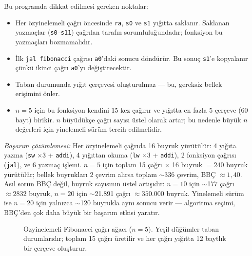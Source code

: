 \begin{ornek}[4.14]
Bu programda dikkat edilmesi gereken noktalar:
\begin{itemize}
\item Her özyinelemeli çağrı öncesinde \texttt{ra}, \texttt{s0} ve \texttt{s1} yığıtta saklanır. Saklanan yazmaçlar (\texttt{s0}--\texttt{s11}) çağrılan tarafın sorumluluğundadır; fonksiyon bu yazmaçları bozmamalıdır.
\item İlk \texttt{jal fibonacci} çağrısı \texttt{a0}'daki sonucu döndürür. Bu sonuç \texttt{s1}'e kopyalanır çünkü ikinci çağrı \texttt{a0}'yı değiştirecektir.
\item Taban durumunda yığıt çerçevesi oluşturulmaz --- bu, gereksiz bellek erişimini önler.
\item $n = 5$ için bu fonksiyon kendini 15 kez çağırır ve yığıtta en fazla 5 çerçeve (60 bayt) birikir. $n$ büyüdükçe çağrı sayısı üstel olarak artar; bu nedenle büyük $n$ değerleri için yinelemeli sürüm tercih edilmelidir.
\end{itemize}

\emph{Başarım çözümlemesi:} Her özyinelemeli çağrıda 16 buyruk yürütülür: 4 yığıta yazma (\texttt{sw} $\times 3$ + \texttt{addi}), 4 yığıttan okuma (\texttt{lw} $\times 3$ + \texttt{addi}), 2 fonksiyon çağrısı (\texttt{jal}), ve 6 yazmaç işlemi. $n = 5$ için toplam 15 çağrı $\times$ 16 buyruk $= 240$ buyruk yürütülür; bellek buyrukları 2 çevrim alırsa toplam $\sim$336 çevrim, BBÇ $\approx 1{,}40$. Asıl sorun BBÇ değil, buyruk sayısının üstel artışıdır: $n = 10$ için $\sim$177 çağrı $\approx 2832$ buyruk, $n = 20$ için $\sim$21.891 çağrı $\approx 350.000$ buyruk. Yinelemeli sürüm ise $n = 20$ için yalnızca $\sim$120 buyrukla aynı sonucu verir --- algoritma seçimi, BBÇ'den çok daha büyük bir başarım etkisi yaratır.
\end{ornek}

\begin{figure}[H]
\centering
{}
\caption[Özyinelemeli Fibonacci çağrı ağacı]{Özyinelemeli Fibonacci çağrı ağacı ($n=5$). Yeşil düğümler taban durumlarıdır; toplam 15 çağrı üretilir ve her çağrı yığıtta 12 baytlık bir çerçeve oluşturur.}
\label{fig:fibonacci-agac}
\end{figure}


